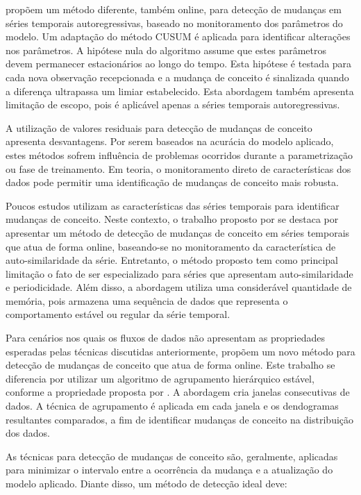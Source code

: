 \documentclass[msc, classic, a4paper]{ufbathesis}
\begin{document}
 propõem um método diferente, também online, para detecção de mudanças em séries temporais autoregressivas, baseado no monitoramento dos parâmetros do modelo. Um adaptação do método CUSUM \cite{Page:CUSUM:PageHinkley:1954} é aplicada para identificar alterações nos parâmetros. A hipótese nula do algoritmo assume que estes parâmetros devem permanecer estacionários ao longo do tempo. Esta hipótese é testada para cada nova observação recepcionada e a mudança de conceito é sinalizada quando a diferença ultrapassa um limiar estabelecido. Esta abordagem também apresenta limitação de escopo, pois é aplicável apenas a séries temporais autoregressivas.

A utilização de valores residuais para detecção de mudanças de conceito  apresenta desvantagens. Por serem baseados na acurácia do modelo aplicado, estes métodos sofrem influência de problemas ocorridos durante a parametrização ou fase de treinamento. Em teoria, o monitoramento direto de características dos dados pode permitir uma identificação de mudanças de conceito mais robusta.

Poucos estudos utilizam as características das séries temporais para identificar mudanças de conceito. Neste contexto, o trabalho proposto por   se destaca por apresentar um método de detecção de mudanças de conceito em séries temporais que atua de forma online, baseando-se no monitoramento da característica de auto-similaridade da série.
Entretanto, o método proposto tem como principal limitação o fato de ser especializado para séries que apresentam auto-similaridade e periodicidade. Além disso, a abordagem utiliza uma considerável quantidade de memória, pois armazena uma sequência de dados que representa o comportamento estável ou regular da série temporal.

Para cenários nos quais os fluxos de dados não apresentam as propriedades esperadas pelas técnicas discutidas anteriormente,  propõem um novo método para detecção de mudanças de conceito que atua de forma online.
Este trabalho se diferencia por utilizar um algoritmo de agrupamento hierárquico estável, conforme a propriedade proposta por .
A abordagem cria janelas consecutivas de dados. A técnica de agrupamento é aplicada em cada janela e os dendogramas resultantes comparados, a fim de identificar mudanças de conceito na distribuição dos dados.

As técnicas para detecção de mudanças de conceito são, geralmente, aplicadas para minimizar o intervalo entre a ocorrência da mudança e a atualização do modelo aplicado. Diante disso, um método de detecção ideal deve:
\end{document}
